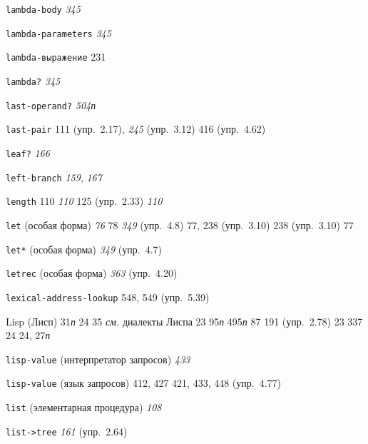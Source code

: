 \begin{theindex}
\item {\texttt{lambda-body}} {\it 345}
\item {\texttt{lambda-parameters}} {\it 345}
\item {\texttt{lambda-выражение}}
   231
\item {\texttt{lambda?}} {\it 345}
\item {\texttt{last-operand?}} {\it 504}{\it п}
\item {\texttt{last-pair}} 111 (упр.~2.17), {\it 245} (упр.~3.12)
   416 (упр.~4.62)
\item {\texttt{leaf?}} {\it 166}
\item {\texttt{left-branch}} {\it 159}, {\it 167}
\item {\texttt{length}} 110
   {\it 110}
   125 (упр.~2.33)
   {\it 110}
\item {\texttt{let} (особая форма)} {\it 76}
   78
   {\it 349} (упр.~4.8)
   77, 238 (упр.~3.10)
   238 (упр.~3.10)
   77
\item {\texttt{let*} (особая форма)} {\it 349} (упр.~4.7)
\item {\texttt{letrec} (особая форма)} {\it 363} (упр.~4.20)
\item {\texttt{lexical-address-lookup}} 548, 549 (упр.~5.39)
\item {Lisp (Лисп)}
   31{\it п}
   24
   35
   {\it см.} диалекты Лиспа
   23
   95{\it п}
   495{\it п}
   87
   191 (упр.~2.78)
   23
   337
   24
   24, 27{\it п}
\item {\texttt{lisp-value} (интерпретатор запросов)} {\it 433}
\item {\texttt{lisp-value} (язык запросов)} 412, 427
   421, 433, 448 (упр.~4.77)
\item {\texttt{list} (элементарная процедура)} {\it 108}
\item {\texttt{list->tree}} {\it 161} (упр.~2.64)

\end{theindex}
